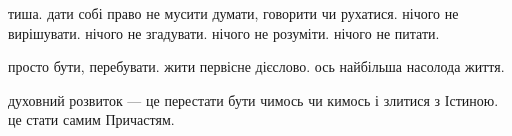 тиша. дати собі право не мусити думати, говорити чи рухатися. нічого не вирішувати. нічого не згадувати. нічого не розуміти. нічого не питати.

просто бути, перебувати. жити первісне дієслово. ось найбільша насолода життя.

духовний розвиток --- це перестати бути чимось чи кимось і злитися з Істиною. це стати самим Причастям.

